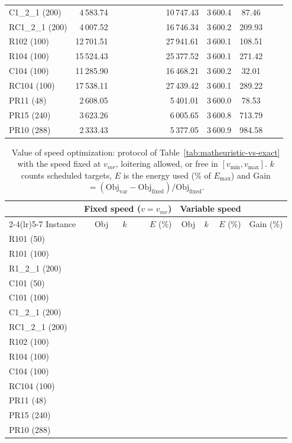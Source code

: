 \documentclass[11pt]{article}
\begin{document}
\begin{table}[H]
{\begin{tabular}{l r rrr rrr rrc rr}
C1\_2\_1 (200) & 4\,583.74 & & & & & & & 10\,747.43 & 3\,600.4 & 87.46 & & \\
RC1\_2\_1 (200) & 4\,007.52 & & & & & & & 16\,746.34 & 3\,600.2 & 209.93 & & \\
R102 (100) & 12\,701.51 & & & & & & & 27\,941.61 & 3\,600.1 & 108.51 & & \\
R104 (100) & 15\,524.43 & & & & & & & 25\,377.52 & 3\,600.1 & 271.42 & & \\
C104 (100) & 11\,285.90 & & & & & & & 16\,468.21 & 3\,600.2 & 32.01 & & \\
RC104 (100) & 17\,538.11 & & & & & & & 27\,439.42 & 3\,600.1 & 289.22 & & \\
PR11 (48) & 2\,608.05 & & & & & & & 5\,401.01 & 3\,600.0 & 78.53 & & \\
PR15 (240) & 3\,623.26 & & & & & & & 6\,005.65 & 3\,600.8 & 713.79 & & \\
PR10 (288) & 2\,333.43 & & & & & & & 5\,377.05 & 3\,600.9 & 984.58 & & \\
\bottomrule
\end{tabular}%
}
\end{table}

\begin{table}[H]
\centering\footnotesize
\setlength{\tabcolsep}{5pt}
\caption{Value of speed optimization: protocol of Table~\ref{tab:matheuristic-vs-exact} with the speed fixed at $v_{mr}$, loitering allowed, or free in $[v_{\min}, v_{\max}]$. $k$ counts scheduled targets, $E$ is the energy used (\% of $E_{\max}$) and Gain $= (\text{Obj}_{\text{var}} - \text{Obj}_{\text{fixed}})/\text{Obj}_{\text{fixed}}$.}\label{tab:fixed-speed}
\begin{tabular}{l rrr rrr r}
\toprule
& \multicolumn{3}{c}{Fixed speed ($v = v_{mr}$)} & \multicolumn{3}{c}{Variable speed} & \\
\cmidrule(lr){2-4}\cmidrule(lr){5-7}
Instance & Obj & $k$ & $E$ (\%) & Obj & $k$ & $E$ (\%) & Gain (\%) \\
\midrule
R101 (50) & & & & & & & \\
R101 (100) & & & & & & & \\
R1\_2\_1 (200) & & & & & & & \\
C101 (50) & & & & & & & \\
C101 (100) & & & & & & & \\
C1\_2\_1 (200) & & & & & & & \\
RC1\_2\_1 (200) & & & & & & & \\
R102 (100) & & & & & & & \\
R104 (100) & & & & & & & \\
C104 (100) & & & & & & & \\
RC104 (100) & & & & & & & \\
PR11 (48) & & & & & & & \\
PR15 (240) & & & & & & & \\
PR10 (288) & & & & & & & \\
\bottomrule
\end{tabular}
\end{table}
\end{document}
